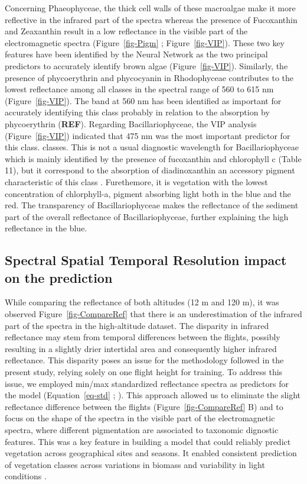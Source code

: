 \documentclass[
  number]{elsarticle}
\begin{document}
Concerning Phaeophyceae, the thick cell walls of these macroalgae
\citep{charrier2021growth} make it more reflective in the infrared part
of the spectra \citep{Slaton2001} whereas the presence of Fucoxanthin
and Zeaxanthin result in a low reflectance in the visible part of the
electromagnetic spectra (Figure~\ref{fig-Pigm} ; Figure~\ref{fig-VIP}).
These two key features have been identified by the Neural Network as the
two principal predictors to accurately identify brown algae
(Figure~\ref{fig-VIP}). Similarly, the presence of phycoerythrin and
phycocyanin in Rhodophyceae contributes to the lowest reflectance among
all classes in the spectral range of 560 to 615 nm
(Figure~\ref{fig-VIP}). The band at 560 nm has been identified as
important for accurately identifying this class probably in relation to
the absorption by phycoerythrin (\textbf{REF}). Regarding
Bacillariophyceae, the VIP analysis (Figure~\ref{fig-VIP}) indicated
that 475 nm was the most important predictor for this class. classes.
This is not a usual diagnostic wavelength for Bacillariophyceae which is
mainly identified by the presence of fucoxanthin and chlorophyll c
(Table 11), but it correspond to the absorption of diadinoxanthin an
accessory pigment characteristic of this class
\citep{meleder2003spectrometric}. Furethemore, it is vegetation with the
lowest concentration of chlorphyll-a, pigment absorbing light both in
the blue and the red. The transparency of Bacillariophyceae makes the
reflectance of the sediment part of the overall reflectance of
Bacillariophyceae, further explaining the high reflectance in the blue.

\subsection{Spectral Spatial Temporal Resolution impact on the
prediction}\label{spectral-spatial-temporal-resolution-impact-on-the-prediction}

While comparing the reflectance of both altitudes (12 m and 120 m), it
was observed Figure~\ref{fig-CompareRef} that there is an
underestimation of the infrared part of the spectra in the high-altitude
dataset. The disparity in infrared reflectance may stem from temporal
differences between the flights, possibly resulting in a slightly drier
intertidal area and consequently higher infrared reflectance. This
disparity poses an issue for the methodology followed in the present
study, relying solely on one flight height for training. To address this
issue, we employed min/max standardized reflectance spectra as
predictors for the model (Equation~\ref{eq-std} ; \citep{Cao2017}). This
approach allowed us to eliminate the slight reflectance difference
between the flights (Figure~\ref{fig-CompareRef} B) and to focus on the
shape of the spectra in the visible part of the electromagnetic spectra,
where different pigmentation are associated to taxonomic dignostic
features. This was a key feature in building a model that could reliably
predict vegetation across geographical sites and seasons. It enabled
consistent prediction of vegetation classes across variations in biomass
and variability in light conditions \citetext{\citealp[
]{fyfe2003spatial}; \citealp[
]{COSTA2021107018}; \citealp{piaser2023impact}}.
\end{document}
